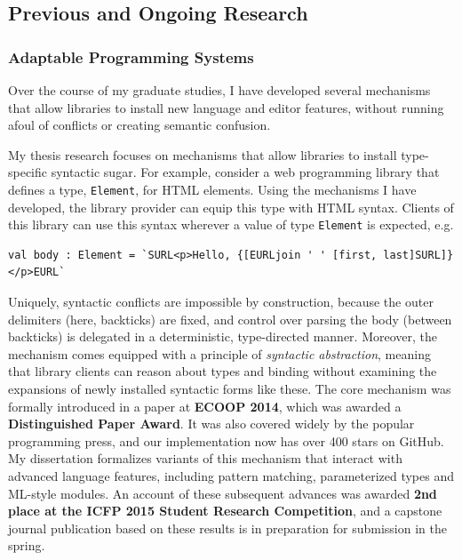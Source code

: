 \documentclass[10pt]{article}
\let\li\lstinline
\begin{document}
\subsection*{Previous and Ongoing Research}
\subsubsection*{Adaptable Programming Systems}

Over the course of my graduate studies, I have developed several mechanisms that allow libraries to install new language and editor features, without running afoul of conflicts or creating semantic confusion.

My thesis research focuses on mechanisms that allow libraries to install type-specific syntactic sugar. For example, consider a web programming library that defines a type, \li{Element}, for HTML elements. Using the mechanisms I have developed, the library provider can equip this type with HTML syntax. Clients of this library can use this syntax wherever a value of type \li{Element} is expected, e.g.
\begin{lstlisting}[numbers=none]
val body : Element = `SURL<p>Hello, {[EURLjoin ' ' [first, last]SURL]}</p>EURL`
\end{lstlisting}
Uniquely, syntactic conflicts are impossible by construction, because the outer delimiters (here, backticks) are fixed, and control over parsing the body (between backticks) is delegated in a deterministic, type-directed manner. Moreover, the mechanism comes equipped with a principle of \emph{syntactic abstraction}, meaning that library clients can reason about types and binding without examining the expansions of newly installed syntactic forms like these. The core mechanism was formally introduced in a paper at \textbf{ECOOP 2014}, which was awarded a \textbf{Distinguished Paper Award}. It was  also covered widely by the popular programming press, and our implementation now has over 400 stars on GitHub.
My dissertation formalizes variants of this mechanism that interact with advanced language features, including pattern matching, parameterized types and ML-style modules. An account of these subsequent advances was awarded \textbf{2nd place at the ICFP 2015 Student Research Competition}, and a capstone journal publication based on these results is in preparation for submission in the spring.
\end{document}
